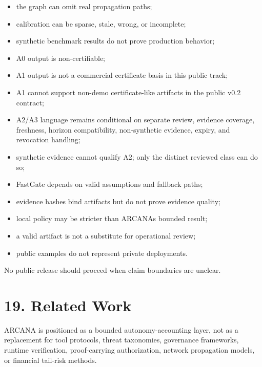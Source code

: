 \documentclass[
  american,
  a4paper,
  10pt]{article}
\providecommand{\tightlist}{%
  \setlength{\itemsep}{0pt}\setlength{\parskip}{0pt}}
\begin{document}
\begin{itemize}
\tightlist
\item
  the graph can omit real propagation paths;
\item
  calibration can be sparse, stale, wrong, or incomplete;
\item
  synthetic benchmark results do not prove production behavior;
\item
  A0 output is non-certifiable;
\item
  A1 output is not a commercial certificate basis in this public track;
\item
  A1 cannot support non-demo certificate-like artifacts in the public v0.2 contract;
\item
  A2/A3 language remains conditional on separate review, evidence coverage, freshness,
  horizon compatibility, non-synthetic evidence, expiry, and revocation handling;
\item
  synthetic  evidence cannot qualify A2; only the distinct
  reviewed  class can do so;
\item
  FastGate depends on valid assumptions and fallback paths;
\item
  evidence hashes bind artifacts but do not prove evidence quality;
\item
  local policy may be stricter than ARCANA\textquotesingle s bounded result;
\item
  a valid artifact is not a substitute for operational review;
\item
  public examples do not represent private deployments.
\end{itemize}

No public release should proceed when claim boundaries are unclear.

\section{19. Related Work}\label{19-related-work}

ARCANA is positioned as a bounded autonomy-accounting layer, not as a replacement for
tool protocols, threat taxonomies, governance frameworks, runtime verification,
proof-carrying authorization, network propagation models, or financial tail-risk
methods.
\end{document}
